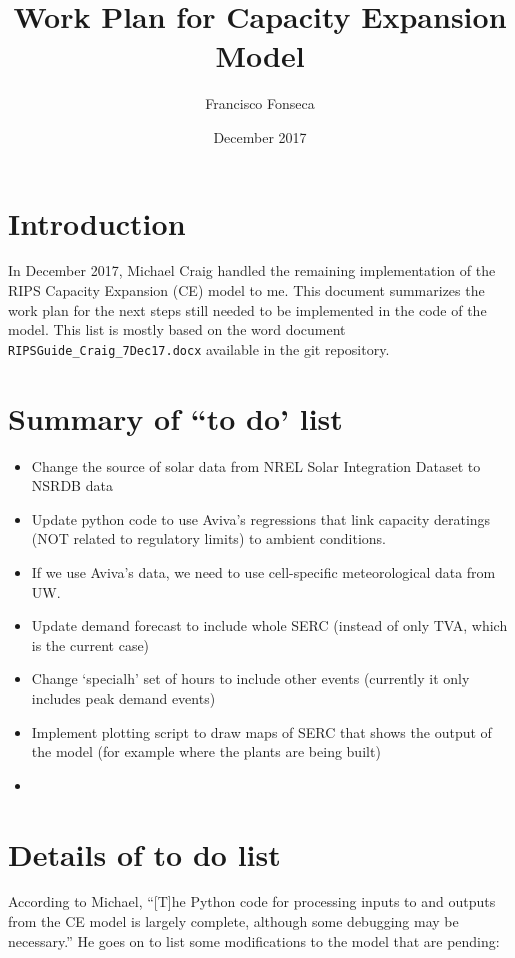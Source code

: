 \documentclass[11pt, oneside]{article}   	%
\title{Work Plan for Capacity Expansion Model}
\author{Francisco Fonseca}
\date{December 2017}							%
\begin{document}
\maketitle
\section{Introduction}

In December 2017, Michael Craig handled the remaining implementation of the RIPS Capacity Expansion (CE) model to me. This document summarizes the work plan for the next steps still needed to be implemented in the code of the model. This list is mostly based on the word document \texttt{RIPSGuide\_Craig\_7Dec17.docx} available in the git repository.

\section{Summary of ``to do' list}

\begin{itemize}
\item Change the source of solar data from NREL Solar Integration Dataset to NSRDB data
\item Update python code to use Aviva's regressions that link capacity deratings (NOT related to regulatory limits) to ambient conditions.
\item If we use Aviva's data, we need to use cell-specific meteorological data from UW.
\item Update demand forecast to include whole SERC (instead of only TVA, which is the current case)
\item Change `specialh' set of hours to include other events (currently it only includes peak demand events)
\item Implement plotting script to draw maps of SERC that shows the output of the model (for example where the plants are being built)
\item 
\end{itemize}


\section{Details of to do list}

According to Michael, ``[T]he Python code for processing inputs to and outputs from the CE model is largely complete, although some debugging may be necessary.'' He goes on to list some modifications to the model that are pending:
\end{document}
